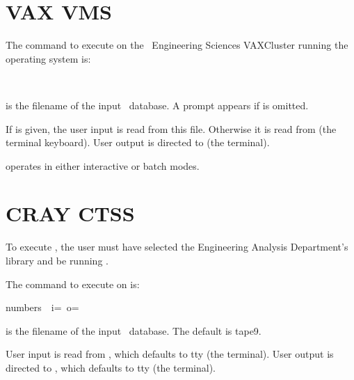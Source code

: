 
\section{VAX VMS}

The command to execute \caps{\numbers} on the \SNL\ Engineering Sciences VAXCluster
running the  operating system is: 
\begin{center}
\ \ 
\end{center}

 is the filename of the input \exo\ 
database. A prompt appears if  is omitted. 

If  is given, the user input is read from this
file. Otherwise it is read from \caps{SYS\$INPUT} (the terminal
keyboard). User output is directed to  (the terminal).

\caps{\numbers} operates in either interactive or batch modes.

\section{CRAY CTSS}

To execute \caps{\numbers}, the user must have selected the Engineering
Analysis Department's \cmd{acclib} library and be running \cmd{ccl}. 

The command to execute \caps{\numbers} on  is:
\begin{center}
\sf numbers\ \ i=\ o=
\end{center}

 is the filename of the input \exo\ 
database. The default is {\sf tape9}.

User input is read from , which defaults to {\sf tty} (the
terminal). User output is directed to , which defaults to
{\sf tty} (the terminal). 
